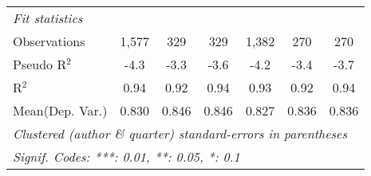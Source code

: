 \begin{tabular}{lcccccc}
   \midrule
   \emph{Fit statistics}\\
   Observations            & 1,577   & 329     & 329          & 1,382   & 270     & 270\\  
   Pseudo R$^2$            & -4.3    & -3.3    & -3.6         & -4.2    & -3.4    & -3.7\\  
   R$^2$                   & 0.94    & 0.92    & 0.94         & 0.93    & 0.92    & 0.94\\  
Mean(Dep. Var.) & 0.830 & 0.846 & 0.846 & 0.827 & 0.836 & 0.836 \\
   \midrule \midrule
   \multicolumn{7}{l}{\emph{Clustered (author \& quarter) standard-errors in parentheses}}\\
   \multicolumn{7}{l}{\emph{Signif. Codes: ***: 0.01, **: 0.05, *: 0.1}}\\
\end{tabular}
\par\endgroup
